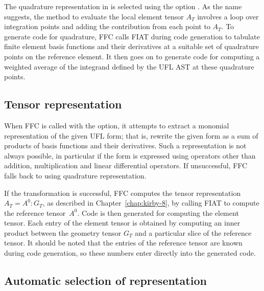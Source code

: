 The quadrature representation in \ffc{} is selected using the
option .  As the name suggests, the method to
evaluate the local element tensor $A_T$ involves a loop over
integration points and adding the contribution from each point to
$A_T$. To generate code for quadrature, FFC calls FIAT during code
generation to tabulate finite element basis functions and their
derivatives at a suitable set of quadrature points on the reference
element. It then goes on to generate code for computing a weighted
average of the integrand defined by the UFL AST at these quadrature
points.

\subsection{Tensor representation}

When FFC is called with the  option,
it attempts to extract a monomial representation of the given UFL
form; that is, rewrite the given form as a sum of products of basis
functions and their derivatives. Such a representation is not always
possible, in particular if the form is expressed using operators other
than addition, multiplication and linear differential operators. If
unsuccessful, FFC falls back to using quadrature representation.

If the transformation is successful, FFC computes the tensor
representation $A_T = A^0 : G_T$, as described in Chapter~\ref{chap:kirby-8},
by calling FIAT to compute the reference tensor~$A^0$. Code is then
generated for computing the element tensor. Each entry of the element
tensor is obtained by computing an inner product between the geometry
tensor $G_T$ and a particular slice of the reference tensor. It should
be noted that the entries of the reference tensor are known during
code generation, so these numbers enter directly into the generated
code.

\subsection{Automatic selection of representation}

